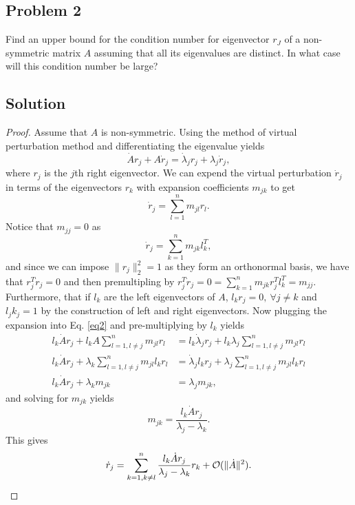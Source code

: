 \documentclass[12pt]{report}
\begin{document}
\begin{problem}%
\subsection*{Problem 2}

Find an upper bound for the condition number for eigenvector $r_J$ of a non-symmetric matrix $A$ assuming that all its eigenvalues are distinct. In what case will this condition number be large? 

\subsection*{Solution}
\begin{proof}

Assume that $A$ is non-symmetric. Using the method of virtual perturbation method and differentiating the eigenvalue yields
\begin{equation}\label{eq2}
    \dot{A}r_j + A\dot{r}_j = \dot{\lambda}_j r_j + \lambda_j \dot{r}_j,
\end{equation}
where $r_j$ is the $j$th right eigenvector. We can expend the virtual perturbation $\dot{r}_j$ in terms of the eigenvectors $r_k$ with expansion coefficients $m_{jk}$ to get
\[
     \dot{r}_j = \sum_{l=1}^n m_{jl}r_l.
\]
Notice that $m_{jj} = 0$ as
\[
     \dot{r}_j = \sum_{k=1}^n m_{jk}l_k^T,
\]
and since we can impose $\|r_j\|_2^2 = 1$ as they form an orthonormal basis, we have that $r_j^T \dot{r}_j = 0$ and then premultipling by $r^T_j\dot{r}_j = 0 = \sum_{k=1}^n m_{jk}r_j^Tl_k^T = m_{jj}$. Furthermore, that if $l_k$ are the left eigenvectors of $A$, $l_k r_j = 0, ~\forall j \neq k$ and $l_j k_j = 1$ by the construction of left and right eigenvectors. Now plugging the expansion into Eq. \ref{eq2} and pre-multiplying by $l_k$ yields
\begin{align*}
    l_k\dot{A}r_j + l_kA\sum_{l=1,l\neq j}^n m_{jl}r_l &= l_k\dot{\lambda}_j r_j + l_k\lambda_j \sum_{l=1,l\neq j}^n m_{jl}r_l\\
    l_k\dot{A}r_j + \lambda_k \sum_{l=1,l\neq j}^n m_{jl} l_k r_l &= \dot{\lambda}_j l_k r_j + \lambda_j \sum_{l=1,l\neq j}^n m_{jl} l_kr_l\\
    l_k\dot{A}r_j + \lambda_k m_{jk} &= \lambda_j m_{jk},
\end{align*}
and solving for $m_{jk}$ yields
\[
     m_{jk} = \frac{l_k\dot{A}r_j}{\lambda_j - \lambda_k}.
\]
This gives
\[
     \dot{r}_j = \sum_{k=1,k\neq l}^n \frac{l_k\dot{A}r_j}{\lambda_j - \lambda_k} r_k + {\mathcal{O}}(\|\dot{A}\|^2).
\]
\end{proof}
\end{problem}
\end{document}
